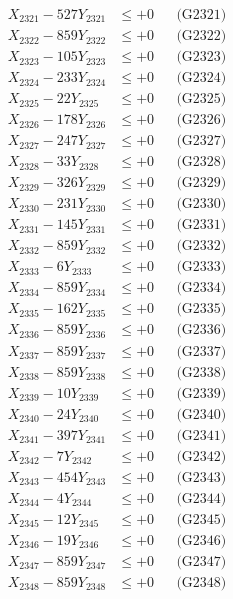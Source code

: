 \documentclass[a4paper,10pt]{article}
\begin{document}
{\begin{align}
\allowbreak
X_{2321} - 527Y_{2321} &\leq +0 && \text{(G2321)} \\
X_{2322} - 859Y_{2322} &\leq +0 && \text{(G2322)} \\
X_{2323} - 105Y_{2323} &\leq +0 && \text{(G2323)} \\
X_{2324} - 233Y_{2324} &\leq +0 && \text{(G2324)} \\
X_{2325} - 22Y_{2325} &\leq +0 && \text{(G2325)} \\
X_{2326} - 178Y_{2326} &\leq +0 && \text{(G2326)} \\
X_{2327} - 247Y_{2327} &\leq +0 && \text{(G2327)} \\
X_{2328} - 33Y_{2328} &\leq +0 && \text{(G2328)} \\
X_{2329} - 326Y_{2329} &\leq +0 && \text{(G2329)} \\
X_{2330} - 231Y_{2330} &\leq +0 && \text{(G2330)} \\
\allowbreak
X_{2331} - 145Y_{2331} &\leq +0 && \text{(G2331)} \\
X_{2332} - 859Y_{2332} &\leq +0 && \text{(G2332)} \\
X_{2333} - 6Y_{2333} &\leq +0 && \text{(G2333)} \\
X_{2334} - 859Y_{2334} &\leq +0 && \text{(G2334)} \\
X_{2335} - 162Y_{2335} &\leq +0 && \text{(G2335)} \\
X_{2336} - 859Y_{2336} &\leq +0 && \text{(G2336)} \\
X_{2337} - 859Y_{2337} &\leq +0 && \text{(G2337)} \\
X_{2338} - 859Y_{2338} &\leq +0 && \text{(G2338)} \\
X_{2339} - 10Y_{2339} &\leq +0 && \text{(G2339)} \\
X_{2340} - 24Y_{2340} &\leq +0 && \text{(G2340)} \\
\allowbreak
X_{2341} - 397Y_{2341} &\leq +0 && \text{(G2341)} \\
X_{2342} - 7Y_{2342} &\leq +0 && \text{(G2342)} \\
X_{2343} - 454Y_{2343} &\leq +0 && \text{(G2343)} \\
X_{2344} - 4Y_{2344} &\leq +0 && \text{(G2344)} \\
X_{2345} - 12Y_{2345} &\leq +0 && \text{(G2345)} \\
X_{2346} - 19Y_{2346} &\leq +0 && \text{(G2346)} \\
X_{2347} - 859Y_{2347} &\leq +0 && \text{(G2347)} \\
X_{2348} - 859Y_{2348} &\leq +0 && \text{(G2348)} \\

\end{align}}
\end{document}
